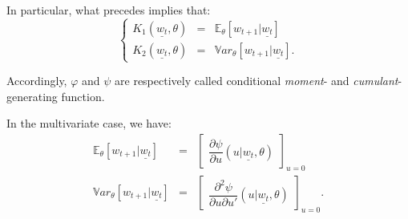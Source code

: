 \documentclass[
  12pt,
]{book}
\theoremstyle{definition}
\theoremstyle{definition}
\theoremstyle{definition}
\theoremstyle{definition}
\theoremstyle{remark}
\begin{document}
In particular, what precedes implies that:
\[
\left\{
\begin{array}{ccc}
K_1(\underline{w_t},\theta) &=& \mathbb{E}_{\theta}[w_{t+1}|\underline{w_t}]\\
K_2(\underline{w_t}, \theta) &=& \mathbb{V}ar_{\theta}[w_{t+1}|\underline{w_t}].
\end{array}
\right.
\]

Accordingly, \(\varphi\) and \(\psi\) are respectively called conditional \emph{moment}- and \emph{cumulant}-generating function.

In the multivariate case, we have:
\begin{eqnarray*}
\mathbb{E}_{\theta}[w_{t+1}|\underline{w_t}] &=& \left[\begin{array}{l}  \dfrac{\partial \psi}{\partial
u} (u|\underline{w_t},\theta)  \end{array} \right]_{u=0} \\
\mathbb{V}ar_{\theta}[w_{t+1}|\underline{w_t}] &=& \left[\begin{array}{l}  \dfrac{\partial^2
\psi}{\partial u\partial u'} (u|\underline{w_t},\theta)  \end{array}
\right]_{u=0}.
\end{eqnarray*}
\end{document}
